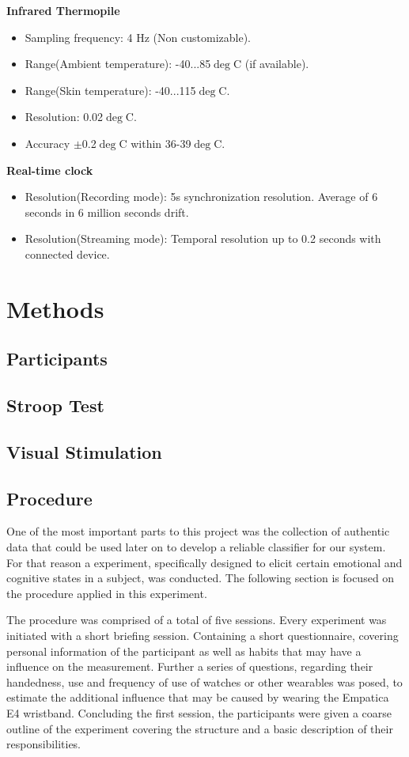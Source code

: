 \textbf{Infrared Thermopile}
\begin{itemize}
\item Sampling frequency: 4 Hz (Non customizable).
\item Range(Ambient temperature): -40...85$\deg$C (if available).
\item Range(Skin temperature): -40...115$\deg$C.
\item Resolution: 0.02$\deg$C.
\item Accuracy $\pm$0.2$\deg$C within 36-39$\deg$C.
\end{itemize}

\textbf{Real-time clock}
\begin{itemize}
\item Resolution(Recording mode): 5s synchronization resolution. Average of 6 seconds in 6 million seconds drift.
\item Resolution(Streaming mode): Temporal resolution up to 0.2 seconds with connected device.
\end{itemize}

\section{Methods}
\subsection{Participants}
\subsection{Stroop Test}
\subsection{Visual Stimulation}
\subsection{Procedure}
One of the most important parts to this project was the collection of authentic data that could be used later on to develop a reliable classifier for our system. For that reason a experiment, specifically designed to elicit certain emotional and cognitive states in a subject, was conducted. The following section is focused on the procedure applied in this experiment.

The procedure was comprised of a total of five sessions. Every experiment was initiated with a short briefing session. Containing a short questionnaire, covering personal information of the participant as well as habits that may have a influence on the measurement. Further a series of questions, regarding their handedness, use and frequency of use of watches or other wearables was posed, to estimate the additional influence that may be caused by wearing the Empatica E4 wristband.
Concluding the first session, the participants were given a coarse outline of the experiment covering the structure and a basic description of their responsibilities.

